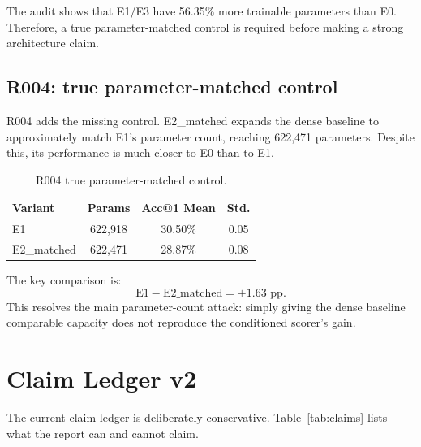 \documentclass[11pt]{article}
\makeatletter
\newcommand{\acc}{Acc@1}
\newcommand{\pp}{pp}
\makeatother
\begin{document}
The audit shows that E1/E3 have 56.35\% more trainable parameters than E0. Therefore, a true parameter-matched control is required before making a strong architecture claim.

\subsection{R004: true parameter-matched control}

R004 adds the missing control. E2\_matched expands the dense baseline to approximately match E1's parameter count, reaching 622,471 parameters. Despite this, its performance is much closer to E0 than to E1.

\begin{table}[t]
\centering
\small
\caption{R004 true parameter-matched control.}
\label{tab:r004}
\begin{tabular}{lccc}
\toprule
Variant & Params & \acc{} Mean & Std. \\
\midrule
E1 & 622,918 & 30.50\% & 0.05 \\
E2\_matched & 622,471 & 28.87\% & 0.08 \\
\bottomrule
\end{tabular}
\end{table}

The key comparison is:
\begin{equation}
  \text{E1} - \text{E2\_matched} = +1.63 \text{ \pp{}}.
\end{equation}
This resolves the main parameter-count attack: simply giving the dense baseline comparable capacity does not reproduce the conditioned scorer's gain.

\section{Claim Ledger v2}

The current claim ledger is deliberately conservative. Table~\ref{tab:claims} lists what the report can and cannot claim.
\end{document}
